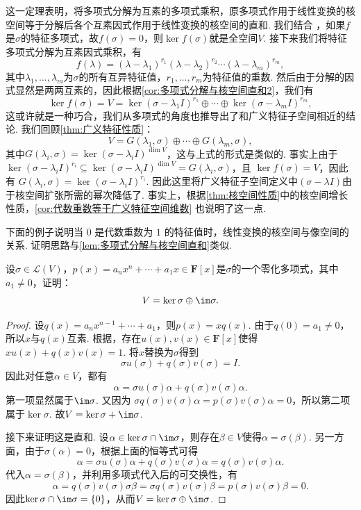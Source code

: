 这一定理表明，将多项式分解为互素的多项式乘积，原多项式作用于线性变换的核空间等于分解后各个互素因式作用于线性变换的核空间的直和. 我们结合 ，如果$f$是$\sigma$的特征多项式，故$f(\sigma)=0$，则$\ker f(\sigma)$就是全空间$V$. 接下来我们将特征多项式分解为互素因式乘积，有
\[f(\lambda)=(\lambda-\lambda_1)^{r_1}(\lambda-\lambda_2)^{r_2}\cdots(\lambda-\lambda_m)^{r_m},\]
其中$\lambda_1,\ldots,\lambda_m$为$\sigma$的所有互异特征值，$r_1,\ldots,r_m$为特征值的重数. 然后由于分解的因式显然是两两互素的，因此根据\autoref{cor:多项式分解与核空间直和2}，我们有
\[\ker f(\sigma)=V=\ker (\sigma-\lambda_1I)^{r_1}\oplus\cdots\oplus\ker (\sigma-\lambda_mI)^{r_m},\]
这或许就是一种巧合，我们从多项式的角度也推导出了和广义特征子空间相近的结论. 我们回顾\autoref{thm:广义特征性质}：
\[V=G(\lambda_1,\sigma)\oplus\cdots\oplus G(\lambda_m,\sigma),\]
其中$G(\lambda_i,\sigma)=\ker (\sigma-\lambda_iI)^{\dim V}$，这与上式的形式是类似的. 事实上由于 $\ker (\sigma-\lambda_iI)^{r_i}\subseteq \ker (\sigma-\lambda_iI)^{\dim V} = G(\lambda_i,\sigma)$，且 $\ker f(\sigma)=V$，因此有 $G(\lambda_i,\sigma)=\ker (\sigma-\lambda_iI)^{r_i}$. 因此这里将广义特征子空间定义中$(\sigma-\lambda I)$由于核空间扩张所需的幂次降低了. 事实上，根据\autoref{thm:核空间性质}中的核空间增长性质，\autoref{cor:代数重数等于广义特征空间维数} 也说明了这一点.

下面的例子说明当 $0$ 是代数重数为 $1$ 的特征值时，线性变换的核空间与像空间的关系. 证明思路与\autoref{lem:多项式分解与核空间直和}类似.

\begin{example}{}{}
    设$\sigma\in \mathcal{L}(V)$，$p(x)=a_nx^n+\cdots+a_1x\in\mathbf{F}[x]$是$\sigma$的一个零化多项式，其中$a_1\neq 0$，证明：
    \[V=\ker \sigma\oplus\im\sigma.\]
\end{example}

\begin{proof}
    设$q(x)=a_nx^{n-1}+\cdots+a_1$，则$p(x)=xq(x)$. 由于$q(0)=a_1\neq 0$，所以$x$与$q(x)$互素. 根据，存在$u(x),v(x)\in\mathbf{F}[x]$使得 $xu(x)+q(x)v(x)=1$. 将$x$替换为$\sigma$得到
    \[
        \sigma u(\sigma)+q(\sigma)v(\sigma)=I.
    \]
    因此对任意$\alpha\in V$，都有
    \[
        \alpha=\sigma u(\sigma)\alpha+q(\sigma)v(\sigma)\alpha.
    \]
    第一项显然属于$\im\sigma$. 又因为 $\sigma q(\sigma)v(\sigma)\alpha=p(\sigma)v(\sigma)\alpha=0$，所以第二项属于$\ker\sigma$. 故$V=\ker\sigma+\im\sigma$.

    接下来证明这是直和. 设$\alpha\in\ker\sigma\cap\im\sigma$，则存在$\beta\in V$使得$\alpha=\sigma(\beta)$. 另一方面，由于$\sigma(\alpha)=0$，根据上面的恒等式可得
    \[
        \alpha=\sigma u(\sigma)\alpha+q(\sigma)v(\sigma)\alpha=q(\sigma)v(\sigma)\alpha.
    \]
    代入$\alpha=\sigma(\beta)$，并利用多项式代入后的可交换性，有
    \[
        \alpha=q(\sigma)v(\sigma)\sigma\beta=\sigma q(\sigma)v(\sigma)\beta=p(\sigma)v(\sigma)\beta=0.
    \]
    因此$\ker\sigma\cap\im\sigma=\{0\}$，从而$V=\ker\sigma\oplus\im\sigma$.
\end{proof}

